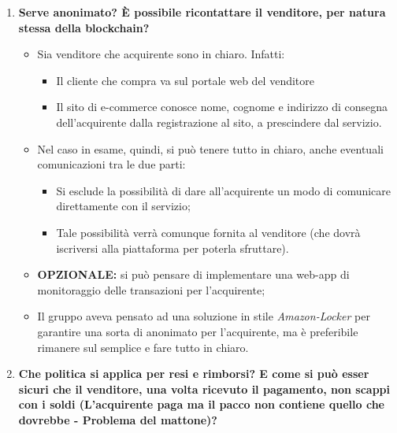 \documentclass[11pt]{article}
\begin{document}
\begin{enumerate}
				\bigskip				
				
				\item \textbf{Serve anonimato? È possibile ricontattare il venditore, per natura stessa della blockchain?}
				
				\medskip
				
				\begin{itemize}
					\item Sia venditore che acquirente sono in chiaro. Infatti:
					\begin{itemize}
						\item Il cliente che compra va sul portale web del venditore 
						\item Il sito di e-commerce conosce nome, cognome e indirizzo di consegna dell'acquirente dalla
						registrazione al sito, a prescindere dal servizio.
					\end{itemize}
					\item Nel caso in esame, quindi, si può tenere tutto in chiaro, anche eventuali comunicazioni tra le due
					parti:
					\begin{itemize}
						\item Si esclude la possibilità di dare all'acquirente un modo di comunicare direttamente con il servizio;
						\item Tale possibilità verrà comunque fornita al venditore (che dovrà iscriversi alla piattaforma per
						poterla sfruttare).
					\end{itemize}
					\item \textbf{OPZIONALE:} si può pensare di implementare una web-app di monitoraggio delle transazioni
					per l'acquirente;
					\item Il gruppo aveva pensato ad una soluzione in stile \textit{Amazon-Locker} per garantire una sorta di anonimato per
					l'acquirente, ma è preferibile rimanere sul semplice e fare tutto in chiaro.
				\end{itemize}
				
				\bigskip
				
				\item \textbf{Che politica si applica per resi e rimborsi? E come si può esser sicuri che il venditore, una volta
				ricevuto il pagamento, non scappi con i soldi (L'acquirente paga ma il pacco non contiene quello che dovrebbe -
				Problema del mattone)?}
				
				\medskip
				

\end{enumerate}
\end{document}
